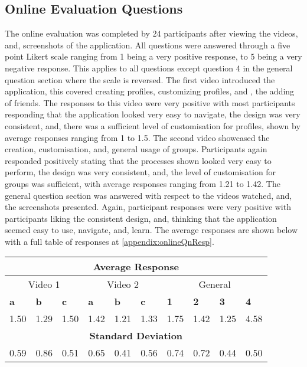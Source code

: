 \subsection{Online Evaluation Questions}

The online evaluation was completed by 24 participants after viewing the videos, and, screenshots of the application. All questions were answered through a five point Likert scale ranging from 1 being a very positive response, to 5 being a very negative response. This applies to all questions except question 4 in the general question section where the scale is reversed. The first video introduced the application, this covered creating profiles, customizing profiles, and , the adding of friends. The responses to this video were very positive with most participants responding that the application looked very easy to navigate, the design was very consistent, and, there was a sufficient level of customisation for profiles, shown by average responses ranging from 1 to 1.5. The second video showcased the creation, customisation, and, general usage of groups. Participants again responded positively stating that the processes shown looked very easy to perform, the design was very consistent, and, the level of customisation for groups was sufficient, with average responses ranging from 1.21 to 1.42. The general question section was answered with respect to the videos watched, and, the screenshots presented. Again, participant responses were very positive with participants liking the consistent design, and, thinking that the application seemed easy to use, navigate, and, learn. The average responses are shown below with a full table of responses at \ref{appendix:onlineQnResp}.

\begin{table}[!ht]
    \centering
    \begin{tabular}{|l|l|l||l|l|l||l|l|l|l|}
    \hline
    \multicolumn{10}{|c|}{\textbf{Average Response }} \\
    \hline
     \multicolumn{3}{|c||}{Video 1 } &
     \multicolumn{3}{|c||}{Video 2 } &
     \multicolumn{4}{|c|}{General } \\
    \hline
        \textbf{a} & \textbf{b} & \textbf{c} & \textbf{a} & \textbf{b} & \textbf{c} & \textbf{1} & \textbf{2} & \textbf{3} & \textbf{4} \\ \hline
    \hline
        1.50 & 1.29 & 1.50 & 1.42 & 1.21 & 1.33 & 1.75 & 1.42 & 1.25 & 4.58 \\ \hline
        \multicolumn{10}{|c|}{\textbf{Standard Deviation }} \\ \hline
        0.59 & 0.86 & 0.51 & 0.65 & 0.41 & 0.56 & 0.74 & 0.72 & 0.44 & 0.50 \\ \hline
    \end{tabular}
\end{table}

